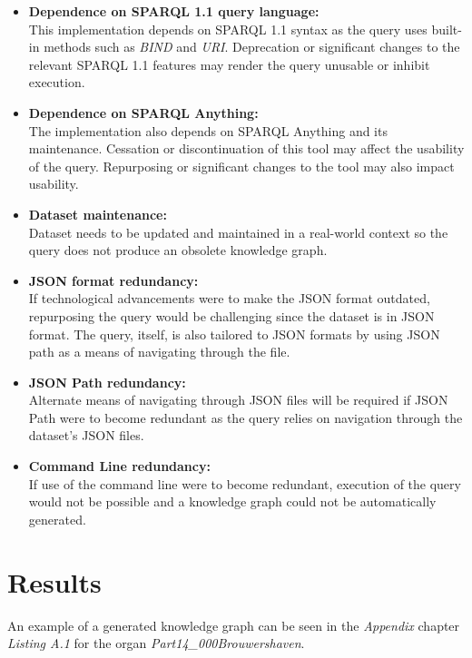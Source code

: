 \begin{itemize}
    \item \textbf{Dependence on SPARQL 1.1 query language:} \\ This implementation depends on SPARQL 1.1 syntax as the query uses built-in methods such as \textit{BIND} and \textit{URI}. Deprecation or significant changes to the relevant SPARQL 1.1 features may render the query unusable or inhibit execution.
    \item \textbf{Dependence on SPARQL Anything:} \\ The implementation also depends on SPARQL Anything and its maintenance. Cessation or discontinuation of this tool may affect the usability of the query. Repurposing or significant changes to the tool may also impact usability. 
    \item \textbf{Dataset maintenance:} \\ Dataset needs to be updated and maintained in a real-world context so the query does not produce an obsolete knowledge graph. 
    \item \textbf{JSON format redundancy:} \\ If technological advancements were to make the JSON format outdated, repurposing the query would be challenging since the dataset is in JSON format. The query, itself, is also tailored to JSON formats by using JSON path as a means of navigating through the file.
    \item \textbf{JSON Path redundancy:} \\ Alternate means of navigating through JSON files will be required if JSON Path were to become redundant as the query relies on navigation through the dataset's JSON files.
    \item \textbf{Command Line redundancy:} \\ If use of the command line were to become redundant, execution of the query would not be possible and a knowledge graph could not be automatically generated. 
\end{itemize}

\section{Results}
\hspace{0.5cm} An example of a generated knowledge graph can be seen in the \textit{Appendix} chapter \textit{Listing A.1} for the organ \textit{Part14\_000Brouwershaven}. 